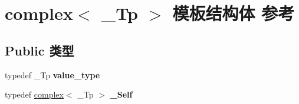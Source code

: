 \hypertarget{structcomplex}{}\section{complex$<$ \+\_\+\+Tp $>$ 模板结构体 参考}
\label{structcomplex}
\subsection*{Public 类型}
\begin{DoxyCompactItemize}
\item 
\mbox{\label{structcomplex_aaae1c4c5e602e41bb02e84132ce10928}} 
typedef \+\_\+\+Tp {\bfseries value\+\_\+type}
\item 
\mbox{\label{structcomplex_a142e0fa346ffb747f11de16d31e5d9bb}} 
typedef \hyperlink{structcomplex}{complex}$<$ \+\_\+\+Tp $>$ {\bfseries \+\_\+\+Self}
\end{DoxyCompactItemize}
